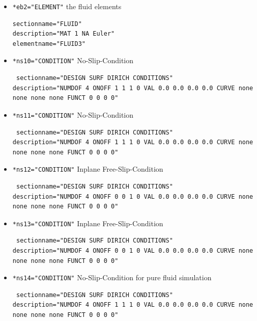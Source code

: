 \begin{itemize}
 \item \verb|*eb2="ELEMENT"| \qquad the fluid elements
 \begin{small} \begin{verbatim}
sectionname="FLUID"
description="MAT 1 NA Euler"
elementname="FLUID3"
\end{verbatim} \end{small}


 \item \verb|*ns10="CONDITION"| \qquad No-Slip-Condition
\begin{small} \begin{verbatim} sectionname="DESIGN SURF DIRICH CONDITIONS"
description="NUMDOF 4 ONOFF 1 1 1 0 VAL 0.0 0.0 0.0 0.0 CURVE none none none none FUNCT 0 0 0 0"
\end{verbatim} \end{small}

 \item \verb|*ns11="CONDITION"| \qquad No-Slip-Condition
\begin{small} \begin{verbatim} sectionname="DESIGN SURF DIRICH CONDITIONS"
description="NUMDOF 4 ONOFF 1 1 1 0 VAL 0.0 0.0 0.0 0.0 CURVE none none none none FUNCT 0 0 0 0"
\end{verbatim} \end{small}

 \item \verb|*ns12="CONDITION"| \qquad Inplane Free-Slip-Condition
\begin{small} \begin{verbatim} sectionname="DESIGN SURF DIRICH CONDITIONS"
description="NUMDOF 4 ONOFF 0 0 1 0 VAL 0.0 0.0 0.0 0.0 CURVE none none none none FUNCT 0 0 0 0"
\end{verbatim} \end{small}

 \item \verb|*ns13="CONDITION"| \qquad Inplane Free-Slip-Condition
\begin{small} \begin{verbatim} sectionname="DESIGN SURF DIRICH CONDITIONS"
description="NUMDOF 4 ONOFF 0 0 1 0 VAL 0.0 0.0 0.0 0.0 CURVE none none none none FUNCT 0 0 0 0"
\end{verbatim} \end{small}

 \item \verb|*ns14="CONDITION"| \qquad No-Slip-Condition for pure fluid simulation
\begin{small} \begin{verbatim} sectionname="DESIGN SURF DIRICH CONDITIONS"
description="NUMDOF 4 ONOFF 1 1 1 0 VAL 0.0 0.0 0.0 0.0 CURVE none none none none FUNCT 0 0 0 0"
\end{verbatim} \end{small}


\end{itemize}
